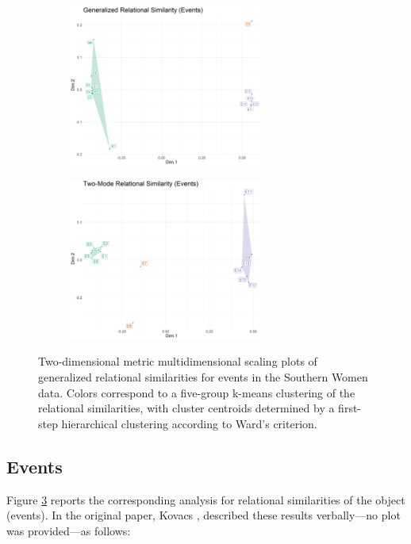 \documentclass[a4paper,fleqn]{cas-sc}
\begin{document}
  \begin{figure}[ht!]
     \begin{subfigure}[b]{1.0\textwidth}
        \centering
        \includegraphics[width=0.7\textwidth]{Plots/grs-events.png}
        \caption{}
        \label{fig:grm-events}
    \end{subfigure} 
     \begin{subfigure}[b]{1.0\textwidth}
        \centering
        \includegraphics[width=0.7\textwidth]{Plots/tmrs-events.png}
        \caption{}
        \label{fig:tmrs-events}
    \end{subfigure} 
    \caption{Two-dimensional metric multidimensional scaling plots of generalized relational similarities for events in the Southern Women data. Colors correspond to a five-group k-means clustering of the relational similarities, with cluster centroids determined by a first-step hierarchical clustering according to Ward's \citeyearpar{ward63} criterion.}
    \label{fig:events}
 \end{figure}

\subsection{Events}
Figure \ref{fig:events} reports the corresponding analysis for relational similarities of the object (events). In the original paper, Kovacs \citeyearpar[206]{kovacs2010}, described these results verbally---no plot was provided---as follows:
\end{document}
